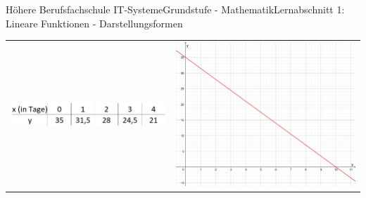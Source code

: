 \documentclass[oneside,openany,headings=optiontotoc,11pt,numbers=noenddot]{scrreprt}
\begin{document}
\begin{worksheet}{Höhere Berufsfachschule IT-Systeme}{Grundstufe - Mathematik}{Lernabschnitt 1: Lineare Funktionen - Darstellungsformen}
\begin{framed}
\begin{tabularx}{\textwidth}{X|X}
				\includegraphics[width=0.4\columnwidth,align=t]{../99_Bilder/tabBspfo.jpg} & \includegraphics[width=0.4\columnwidth,align=t]{../99_Bilder/beispielDarstfo.png}\\
			\end{tabularx}
		\end{framed}
	\end{worksheet}
\end{document}
